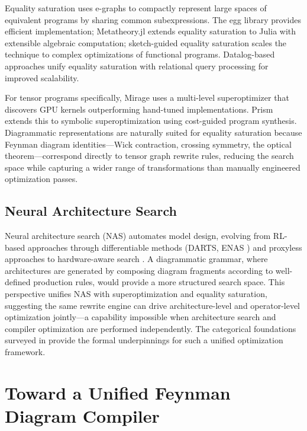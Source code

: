 \documentclass[12pt,a4paper]{article}
\begin{document}
Equality saturation \cite{tate2011equality} uses e-graphs to compactly represent large spaces of equivalent programs by sharing common subexpressions. The egg library provides efficient implementation; Metatheory.jl \cite{cheli2021metatheoryjl} extends equality saturation to Julia with extensible algebraic computation; sketch-guided equality saturation \cite{koehler2021sketchguided} scales the technique to complex optimizations of functional programs. Datalog-based approaches \cite{zhang2023better} unify equality saturation with relational query processing for improved scalability.

For tensor programs specifically, Mirage \cite{wu2024mirage} uses a multi-level superoptimizer that discovers GPU kernels outperforming hand-tuned implementations. Prism \cite{wu2026prism} extends this to symbolic superoptimization using cost-guided program synthesis. Diagrammatic representations are naturally suited for equality saturation because Feynman diagram identities---Wick contraction, crossing symmetry, the optical theorem---correspond directly to tensor graph rewrite rules, reducing the search space while capturing a wider range of transformations than manually engineered optimization passes.

\subsection{Neural Architecture Search}

Neural architecture search (NAS) automates model design, evolving from RL-based approaches \cite{zoph2016neural} through differentiable methods (DARTS, ENAS \cite{pham2018efficientna}) and proxyless approaches \cite{cai2018proxylessnas} to hardware-aware search \cite{elsken2018neural, elsken2019neural}. A diagrammatic grammar, where architectures are generated by composing diagram fragments according to well-defined production rules, would provide a more structured search space. This perspective unifies NAS with superoptimization and equality saturation, suggesting the same rewrite engine can drive architecture-level and operator-level optimization jointly---a capability impossible when architecture search and compiler optimization are performed independently. The categorical foundations surveyed in \cite{crescenzi2024towards} provide the formal underpinnings for such a unified optimization framework.

\section{Toward a Unified Feynman Diagram Compiler}
\end{document}
